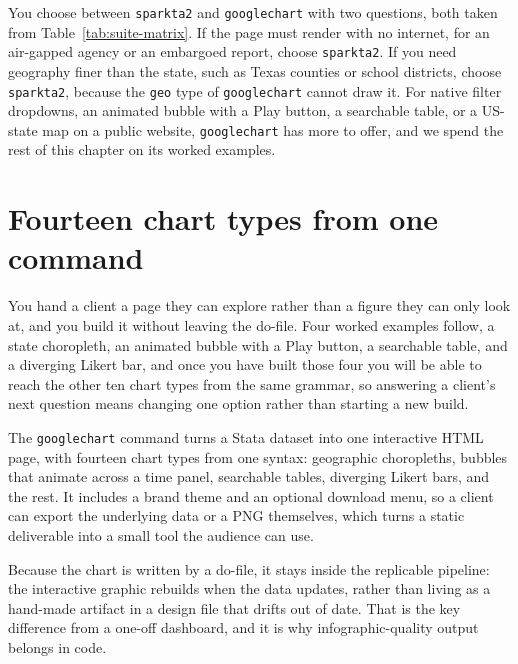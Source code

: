 You choose between \texttt{sparkta2} and \texttt{googlechart} with two questions, both taken from Table~\ref{tab:suite-matrix}. If the page must render with no internet, for an air-gapped agency or an embargoed report, choose \texttt{sparkta2}. If you need geography finer than the state, such as Texas counties or school districts, choose \texttt{sparkta2}, because the \texttt{geo} type of \texttt{googlechart} cannot draw it. For native filter dropdowns, an animated bubble with a Play button, a searchable table, or a US-state map on a public website, \texttt{googlechart} has more to offer, and we spend the rest of this chapter on its worked examples.

\section{Fourteen chart types from one command}
You hand a client a page they can explore rather than a figure they can only look at, and you build it without leaving the do-file. Four worked examples follow, a state choropleth, an animated bubble with a Play button, a searchable table, and a diverging Likert bar, and once you have built those four you will be able to reach the other ten chart types from the same grammar, so answering a client's next question means changing one option rather than starting a new build.

The \texttt{googlechart} command turns a Stata dataset into one interactive HTML page, with fourteen chart types from one syntax: geographic choropleths, bubbles that animate across a time panel, searchable tables, diverging Likert bars, and the rest. It includes a brand theme and an optional download menu, so a client can export the underlying data or a PNG themselves, which turns a static deliverable into a small tool the audience can use.

Because the chart is written by a do-file, it stays inside the replicable pipeline: the interactive graphic rebuilds when the data updates, rather than living as a hand-made artifact in a design file that drifts out of date. That is the key difference from a one-off dashboard, and it is why infographic-quality output belongs in code.

